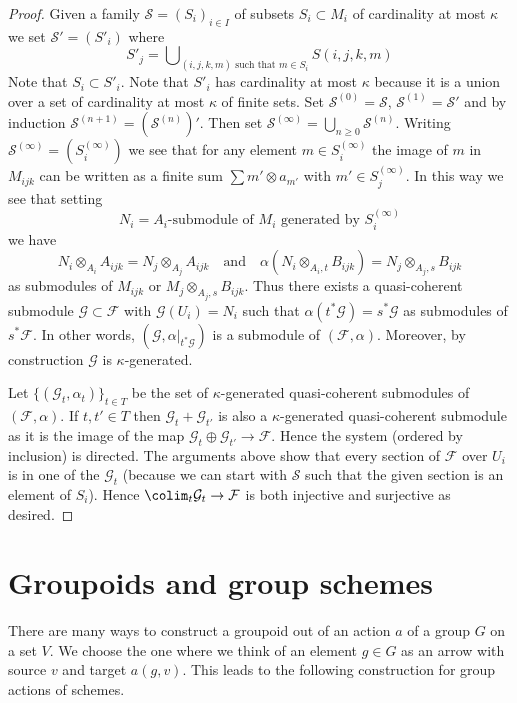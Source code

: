 \begin{proof}
\medskip\noindent
Given a family $\mathcal{S} = (S_i)_{i \in I}$ of subsets
$S_i \subset M_i$ of cardinality at most $\kappa$ we set
$\mathcal{S}' = (S'_i)$ where
$$
S'_j = \bigcup\nolimits_{(i, j, k, m)\text{ such that }m \in S_i}
S(i, j, k, m)
$$
Note that $S_i \subset S'_i$. Note that $S'_i$ has cardinality at most
$\kappa$ because it is a union over a set of cardinality at most $\kappa$
of finite sets. Set $\mathcal{S}^{(0)} = \mathcal{S}$,
$\mathcal{S}^{(1)} = \mathcal{S}'$ and by induction
$\mathcal{S}^{(n + 1)} = (\mathcal{S}^{(n)})'$. Then set
$\mathcal{S}^{(\infty)} = \bigcup_{n \geq 0} \mathcal{S}^{(n)}$.
Writing $\mathcal{S}^{(\infty)} = (S^{(\infty)}_i)$ we see that
for any element $m \in S^{(\infty)}_i$ the image of $m$ in
$M_{ijk}$ can be written as a finite sum $\sum m' \otimes a_{m'}$
with $m' \in S_j^{(\infty)}$. In this way we see that setting
$$
N_i = A_i\text{-submodule of }M_i\text{ generated by }S^{(\infty)}_i
$$
we have
$$
N_i \otimes_{A_i} A_{ijk} = N_j \otimes_{A_j} A_{ijk}
\quad\text{and}\quad
\alpha(N_i \otimes_{A_i, t} B_{ijk}) = N_j \otimes_{A_j, s} B_{ijk}
$$
as submodules of $M_{ijk}$ or $M_j \otimes_{A_j, s} B_{ijk}$.
Thus there exists a quasi-coherent submodule
$\mathcal{G} \subset \mathcal{F}$ with $\mathcal{G}(U_i) = N_i$
such that $\alpha(t^*\mathcal{G}) = s^*\mathcal{G}$ as submodules
of $s^*\mathcal{F}$. In other words,
$(\mathcal{G}, \alpha|_{t^*\mathcal{G}})$ is a submodule of
$(\mathcal{F}, \alpha)$.
Moreover, by construction $\mathcal{G}$ is $\kappa$-generated.

\medskip\noindent
Let $\{(\mathcal{G}_t, \alpha_t)\}_{t \in T}$ be the set of
$\kappa$-generated quasi-coherent submodules of $(\mathcal{F}, \alpha)$.
If $t, t' \in T$ then $\mathcal{G}_t + \mathcal{G}_{t'}$ is also a
$\kappa$-generated quasi-coherent submodule as it is the image of the map
$\mathcal{G}_t \oplus \mathcal{G}_{t'} \to \mathcal{F}$.
Hence the system (ordered by inclusion) is directed.
The arguments above show that every section of $\mathcal{F}$ over $U_i$
is in one of the $\mathcal{G}_t$ (because we can start with $\mathcal{S}$
such that the given section is an element of $S_i$). Hence
$\colim_t \mathcal{G}_t \to \mathcal{F}$ is both injective and surjective
as desired.
\end{proof}

\section{Groupoids and group schemes}
\label{groupoids-section-groupoids-group-schemes}
There are many ways to construct a groupoid out of an action $a$
of a group $G$ on a set $V$. We choose the one where we think
of an element $g \in G$ as an arrow with source $v$ and target $a(g, v)$.
This leads to the following construction for group actions of
schemes.

